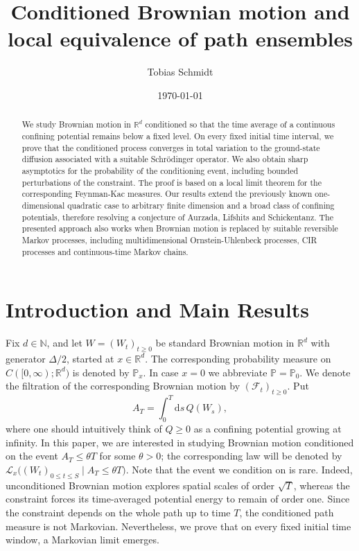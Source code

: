 \documentclass[11pt,reqno]{amsart}
\title{Conditioned Brownian motion and local equivalence of path ensembles}
\author{Tobias Schmidt}
\date{\today}
\theoremstyle{definition}
\numberwithin{equation}{section}
\newcommand{\<}{\langle}
\renewcommand{\>}{\rangle}
\def\de{{\rm d}}
\def\cL{{\cal L}}
\def\de{{\mathrm {d}}}
\def\cL{{\mathcal{L}}}
\begin{document}
\begin{abstract}
    We study Brownian motion in $\mathbb R^d$ conditioned so that the time average of a continuous confining potential remains below a fixed level. On every fixed initial time interval, we prove that the conditioned process converges in total variation to the ground-state diffusion associated with a suitable Schrödinger operator. We also obtain sharp asymptotics for the probability of the conditioning event, including bounded perturbations of the constraint. The proof is based on a local limit theorem for the corresponding Feynman-Kac measures. Our results extend the previously known one-dimensional quadratic case to arbitrary finite dimension and a broad class of confining potentials, therefore resolving a conjecture of Aurzada, Lifshits and Schickentanz. 
    The presented approach also works when Brownian motion is replaced by suitable reversible Markov processes, including multidimensional Ornstein-Uhlenbeck processes, CIR processes and continuous-time Markov chains.
\end{abstract}
\maketitle
\section{Introduction and Main Results}

Fix $d\in\mathbb N$, and let $W=(W_t)_{t\geq0}$ be standard Brownian motion in $\mathbb R^d$ with generator $\Delta/2$, started at $x\in\mathbb R^d$. The corresponding probability measure on $C([0,\infty);\mathbb R^d)$ is denoted by $\mathbb P_x$. In case $x=0$ we abbreviate $\mathbb P=\mathbb P_0$. We denote the filtration of the corresponding Brownian motion by $(\mathcal F_t)_{t\ge0}$. Put
\[
 A_T =\int_0^T \de s \, Q(W_s),
\]
where one should intuitively think of $Q\ge 0$ as a confining potential growing at infinity.
In this paper, we are interested in studying Brownian motion conditioned on the event $A_T \le \theta T$ for some $\theta >0$; the corresponding law will be denoted by $\cL_x\bigl((W_t)_{0\leq t\leq S}\mid A_T\leq\theta T\bigr)$. 
Note that the event we condition on is rare.  Indeed, unconditioned Brownian motion explores spatial
scales of order $\sqrt T$, whereas the constraint forces its time-averaged
potential energy to remain of order one.  Since the constraint depends on the
whole path up to time $T$, the conditioned path measure is not Markovian.  Nevertheless, we prove that on every fixed initial time window, a Markovian limit emerges.
\end{document}
